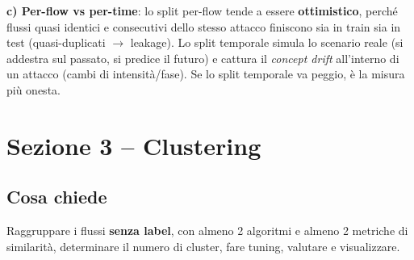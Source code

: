 \begin{strategia}
\textbf{c) Per-flow vs per-time}: lo split per-flow tende a essere
\textbf{ottimistico}, perché flussi quasi identici e consecutivi dello stesso
attacco finiscono sia in train sia in test (quasi-duplicati $\rightarrow$
leakage). Lo split temporale simula lo scenario reale (si addestra sul passato,
si predice il futuro) e cattura il \emph{concept drift} all'interno di un
attacco (cambi di intensità/fase). Se lo split temporale va peggio, è la
misura più onesta.
\end{strategia}

\section{Sezione 3 -- Clustering}

\subsection{Cosa chiede}
Raggruppare i flussi \textbf{senza label}, con almeno 2 algoritmi e almeno 2
metriche di similarità, determinare il numero di cluster, fare tuning,
valutare e visualizzare.

